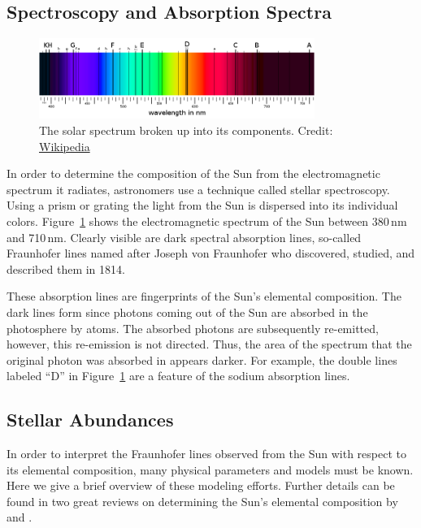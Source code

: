 \subsection{Spectroscopy and Absorption Spectra}

\begin{figure}[tb]
    \centering
    \includegraphics[width=0.8\textwidth]{graphics/solar_system_abundances/fraunhofer_lines_800px}
    \caption{The solar spectrum broken up into its components. Credit: \href{https://en.wikipedia.org/wiki/Fraunhofer_lines}{Wikipedia}}
    \label{fig:fraunhofer_lines}
\end{figure}
In order to determine the composition of the Sun from the electromagnetic spectrum it radiates, astronomers use a technique called stellar spectroscopy. Using a prism or grating the light from the Sun is dispersed into its individual colors. Figure~\ref{fig:fraunhofer_lines} shows the electromagnetic spectrum of the Sun between 380\,nm and 710\,nm. Clearly visible are dark spectral absorption lines, so-called Fraunhofer lines named after Joseph von Fraunhofer who discovered, studied, and described them in 1814.

These absorption lines are fingerprints of the Sun's elemental composition. The dark lines form since photons coming out of the Sun are absorbed in the photosphere by atoms. The absorbed photons are subsequently re-emitted, however, this re-emission is not directed. Thus, the area of the spectrum that the original photon was absorbed in appears darker. For example, the double lines labeled ``D'' in Figure~\ref{fig:fraunhofer_lines} are a feature of the sodium absorption lines.


\subsection{Stellar Abundances} \label{sec:solar_abundances:sun:stellar_abundances}

In order to interpret the Fraunhofer lines observed from the Sun with respect to its elemental composition, many physical parameters and models must be known. Here we give a brief overview of these modeling efforts. Further details can be found in two great reviews on determining the Sun's elemental composition by \citet{asplund09} and \citet{allende-prieto16}.

